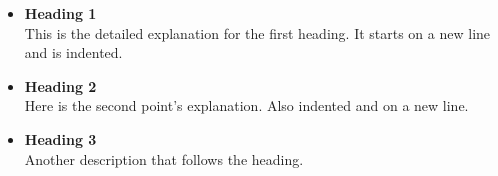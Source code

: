 \begin{itemize}
  \item \textbf{Heading 1} \\
  \hspace*{2em}This is the detailed explanation for the first heading. It starts on a new line and is indented.
  
  \item \textbf{Heading 2} \\
  \hspace*{2em}Here is the second point's explanation. Also indented and on a new line.
  
  \item \textbf{Heading 3} \\
  \hspace*{2em}Another description that follows the heading.
\end{itemize}
